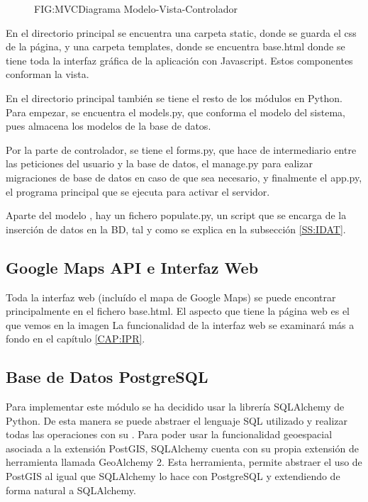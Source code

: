       \begin{figure}[Diagrama Modelo-Vista-Controlador]{FIG:MVC}{Diagrama Modelo-Vista-Controlador}
      \end{figure}
      
      En el directorio principal se encuentra una carpeta static, donde se guarda el css de la página, y una carpeta templates, donde se encuentra  base.html donde se tiene toda la interfaz gráfica de la aplicación con Javascript. Estos componentes conforman la vista. 
       
      En el directorio principal también se tiene el resto de los módulos en Python. Para empezar, se encuentra el models.py, que conforma el modelo del sistema, pues almacena los modelos de la base de datos.
      
      Por la parte de controlador, se tiene el forms.py, que hace de intermediario entre las peticiones del usuario y la base de datos, el manage.py para ealizar migraciones de base de datos en caso de que sea necesario, y finalmente el app.py, el programa principal que se ejecuta para activar el servidor.
      
      Aparte del modelo , hay un fichero populate.py, un script que se encarga de la inserción de datos en la BD, tal y como se explica en la subsección \ref{SS:IDAT}.
      
      
    \subsection{Google Maps API e Interfaz Web}
      Toda la interfaz web (incluído el mapa de Google Maps) se puede encontrar principalmente en el fichero base.html.
      El aspecto que tiene la página web es el que vemos en la imagen
      La funcionalidad de la interfaz web se examinará más a fondo en el capítulo \ref{CAP:IPR}.
      
      
    \subsection{Base de Datos PostgreSQL}
      Para implementar este módulo se ha decidido usar la librería SQLAlchemy\cite{sqlalchemy} de Python. De esta manera se puede abstraer el lenguaje SQL utilizado y realizar todas las operaciones con su . 
      Para poder usar la funcionalidad geoespacial asociada a la extensión PostGIS, SQLAlchemy cuenta con su propia extensión de herramienta llamada GeoAlchemy 2\cite{geoalchemy}. Esta herramienta, permite abstraer el uso de PostGIS al igual que SQLAlchemy lo hace con PostgreSQL y extendiendo de forma natural a SQLAlchemy.
      

